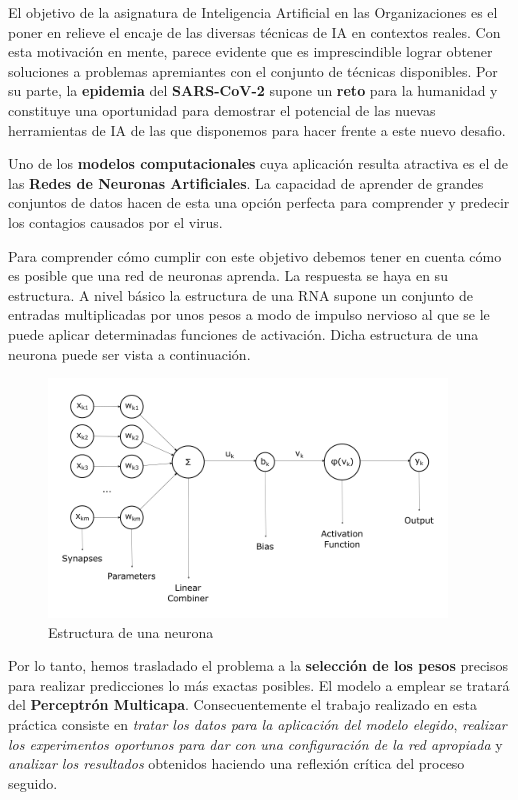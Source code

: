 \documentclass[12pt,a4paper, xcolor=table]{article}
\begin{document}
  El objetivo de la asignatura de Inteligencia Artificial en las Organizaciones es el poner en relieve el encaje de las diversas técnicas de IA en contextos reales. Con esta motivación en mente, parece evidente que es imprescindible lograr obtener soluciones a problemas apremiantes con el conjunto de técnicas disponibles. Por su parte, la \textbf{epidemia} del\textbf{ SARS-CoV-2 }supone un \textbf{reto} para la humanidad y constituye una oportunidad para demostrar el potencial de las nuevas herramientas de IA de las que disponemos para hacer frente a este nuevo desafio.

  \vspace{3mm}

  Uno de los \textbf{modelos computacionales} cuya aplicación resulta atractiva es el de las \textbf{Redes de Neuronas Artificiales}. La capacidad de aprender de grandes conjuntos de datos hacen de esta una opción perfecta para comprender y predecir los contagios causados por el virus.

  \vspace{2mm}

  Para comprender cómo cumplir con este objetivo debemos tener en cuenta cómo es posible que una red de neuronas aprenda. La respuesta se haya en su estructura. A nivel básico la estructura de una RNA supone un conjunto de entradas multiplicadas por unos pesos a modo de impulso nervioso al que se le puede aplicar determinadas funciones de activación. Dicha estructura de una neurona puede ser vista a continuación.

  \begin{figure}[h]
      \centering
      \includegraphics[width=400px]{img/Neuron.png}
      \captionsetup{labelformat=empty}
      \caption{Estructura de una neurona}
  \end{figure}

  Por lo tanto, hemos trasladado el problema a la \textbf{selección de los pesos} precisos para realizar predicciones lo más exactas posibles. El modelo a emplear se tratará del \textbf{Perceptrón Multicapa}. Consecuentemente el trabajo realizado en esta práctica consiste en \textit{tratar los datos para la aplicación del modelo elegido}, \textit{realizar los experimentos oportunos para dar con una configuración de la red apropiada} y \textit{analizar los resultados} obtenidos haciendo una reflexión crítica del proceso seguido.
\end{document}
